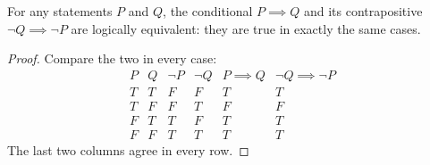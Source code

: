 \begin{theorem}[Contrapositive]\label{thm:contrapositive}
  For any statements $P$ and $Q$, the conditional $P \implies Q$ and its
  contrapositive $\lnot Q \implies \lnot P$ are logically equivalent: they are
  true in exactly the same cases.
\end{theorem}

\begin{proof}
  Compare the two in every case:
  \[
    \begin{array}{cccc|c|c}
      P & Q & \lnot P & \lnot Q & P \implies Q & \lnot Q \implies \lnot P \\
      \hline
      T & T & F & F & T & T \\
      T & F & F & T & F & F \\
      F & T & T & F & T & T \\
      F & F & T & T & T & T
    \end{array}
  \]
  The last two columns agree in every row.
\end{proof}
